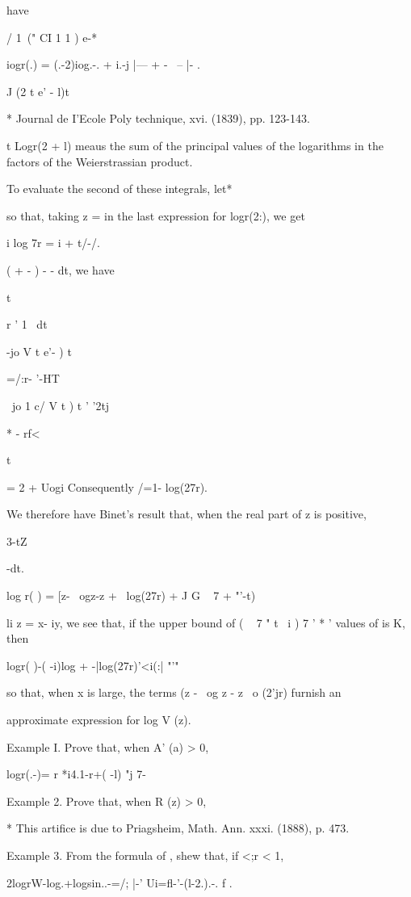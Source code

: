 have

/ 1\ (" CI 1 1 ) e-*

iogr(.) = (.-2)iog.-. + i.-j |--- + - \ -- |- .

J (2 t e' - l)t

* Journal de I'Ecole Poly technique, xvi. (1839), pp. 123-143.

t Logr(2 + l) meaus the sum of the principal values of the logarithms
in the factors of the Weierstrassian product.

%
%

To evaluate the second of these integrals, let*

so that, taking z = in the last expression for logr(2:), we get

i log 7r = i + t/-/.

( + - ) - - dt, we have

t

r ' 1 \ dt

-jo V t e'- ) t

=/:r- '-HT

~jo 1 c/ V t ) t ' '2tj

* - rf<

t

= 2 + Uogi Consequently /=1- log(27r).

We therefore have Binet's result that, when the real part of z is
positive,

3-tZ

 -dt.

log r( ) = [z- \ ogz-z + \ log(27r) + J G ~ 7 + "'-t)

li z = x- iy, we see that, if the upper bound of ( ~ 7 " t \ i ) 7 ' *
' values of is K, then

logr( )-( -i)log + -|log(27r)'<i(:| "'"

so that, when x is large, the terms (z - \ og z - z \ o (2'jr) furnish
an

approximate expression for log V (z).

Example I. Prove that, when A' (a) > 0,

logr(.-)= r *i4.1-r+( -l) "j 7- 

Example 2. Prove that, when R (z) > 0,

* This artifice is due to Priagsheim, Math. Ann. xxxi. (1888), p. 473.

%
%

Example 3. From the formula of , shew that, if <;r < 1,

2logrW-log.+logsin..-=/; |-' Ui=fl-'-(l-2.).-. f .

